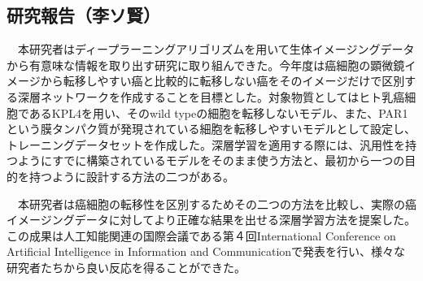\subsection{研究報告（李ソ賢）}

　本研究者はディープラーニングアリゴリズムを用いて生体イメージングデータから有意味な情報を取り出す研究に取り組んできた。今年度は癌細胞の顕微鏡イメージから転移しやすい癌と比較的に転移しない癌をそのイメージだけで区別する深層ネットワークを作成することを目標とした。対象物質としてはヒト乳癌細胞であるKPL4を用い、そのwild typeの細胞を転移しないモデル、また、PAR1という膜タンパク質が発現されている細胞を転移しやすいモデルとして設定し、トレーニングデータセットを作成した。深層学習を適用する際には、汎用性を持つようにすでに構築されているモデルをそのまま使う方法と、最初から一つの目的を持つように設計する方法の二つがある。

　本研究者は癌細胞の転移性を区別するためその二つの方法を比較し、実際の癌イメージングデータに対してより正確な結果を出せる深層学習方法を提案した。この成果は人工知能関連の国際会議である第４回International Conference on Artificial Intelligence in Information and Communicationで発表を行い、様々な研究者たちから良い反応を得ることができた。

